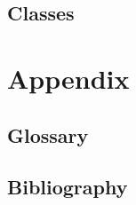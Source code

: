 \documentclass[10pt,twoside,twocolumn,openany,nomultitoc]{book}
\begin{document}
\section{Classes}

\chapter{Appendix}
\section{Glossary}
\printglossaries


\section{Bibliography}
\begingroup
\let\clearpage\relax

    \nocite{*}

    \endgroup




\end{document}
